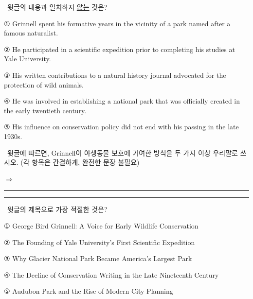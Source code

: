 \documentclass[11pt,a4paper]{article}
\newcommand{\qno}[1]{\par\vspace{8pt}\noindent{\sffamily\bfseries #1.}\ }
\newcommand{\instr}[1]{{\sffamily #1}\par\vspace{3pt}}
\begin{document}
\qno{2}\instr{윗글의 내용과 일치하지 \underline{않는} 것은?}
\begin{choices}
\item ① Grinnell spent his formative years in the vicinity of a park named after a famous naturalist.
\item ② He participated in a scientific expedition prior to completing his studies at Yale University.
\item ③ His written contributions to a natural history journal advocated for the protection of wild animals.
\item ④ He was involved in establishing a national park that was officially created in the early twentieth century.
\item ⑤ His influence on conservation policy did not end with his passing in the late 1930s.
\end{choices}

\qno{3}\instr{[서술형] 윗글에 따르면, Grinnell이 야생동물 보호에 기여한 방식을 두 가지 이상 우리말로 쓰시오. (각 항목은 간결하게, 완전한 문장 불필요)}

\vspace{4pt}
\noindent $\Rightarrow$ \rule{10cm}{0.4pt}

\vspace{8pt}
\noindent \rule{\linewidth}{0.4pt}

\qno{4}\instr{윗글의 제목으로 가장 적절한 것은?}
\begin{choices}
\item ① George Bird Grinnell: A Voice for Early Wildlife Conservation
\item ② The Founding of Yale University's First Scientific Expedition
\item ③ Why Glacier National Park Became America's Largest Park
\item ④ The Decline of Conservation Writing in the Late Nineteenth Century
\item ⑤ Audubon Park and the Rise of Modern City Planning
\end{choices}
\end{document}
